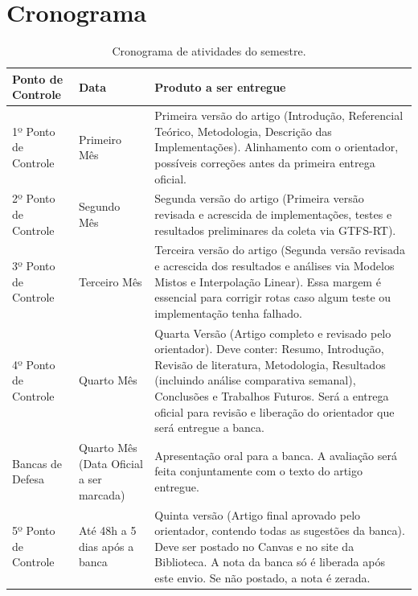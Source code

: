 \section{Cronograma}
\begin{table}[htbp]
\centering
\caption{Cronograma de atividades do semestre.}
\label{tab:cronograma_atividades}
\begin{tabular}{|p{3.5cm}|p{3.5cm}|p{7cm}|}
\hline
\textbf{Ponto de Controle} & \textbf{Data} & \textbf{Produto a ser entregue} \\ \hline
1º Ponto de Controle & Primeiro Mês & Primeira versão do artigo (Introdução, Referencial Teórico, Metodologia, Descrição das Implementações). Alinhamento com o orientador, possíveis correções antes da primeira entrega oficial. \\ \hline
2º Ponto de Controle & Segundo Mês & Segunda versão do artigo (Primeira versão revisada e acrescida de implementações, testes e resultados preliminares da coleta via GTFS-RT). \\ \hline
3º Ponto de Controle & Terceiro Mês & Terceira versão do artigo (Segunda versão revisada e acrescida dos resultados e análises via Modelos Mistos e Interpolação Linear). Essa margem é essencial para corrigir rotas caso algum teste ou implementação tenha falhado. \\ \hline
4º Ponto de Controle & Quarto Mês & Quarta Versão (Artigo completo e revisado pelo orientador). Deve conter: Resumo, Introdução, Revisão de literatura, Metodologia, Resultados (incluindo análise comparativa semanal), Conclusões e Trabalhos Futuros. Será a entrega oficial para revisão e liberação do orientador que será entregue a banca. \\ \hline
Bancas de Defesa & Quarto Mês (Data Oficial a ser marcada) & Apresentação oral para a banca. A avaliação será feita conjuntamente com o texto do artigo entregue. \\ \hline
5º Ponto de Controle & Até 48h a 5 dias após a banca & Quinta versão (Artigo final aprovado pelo orientador, contendo todas as sugestões da banca). Deve ser postado no Canvas e no site da Biblioteca. A nota da banca só é liberada após este envio. Se não postado, a nota é zerada. \\ \hline
\end{tabular}
\end{table}